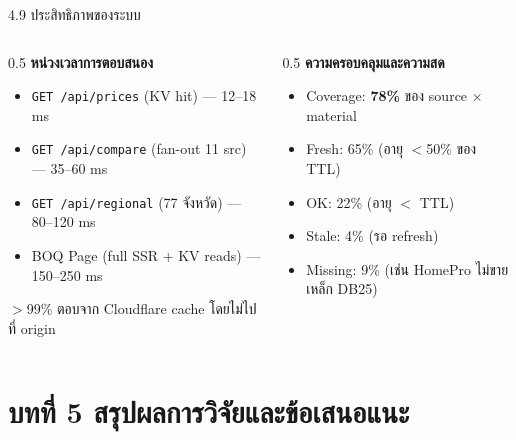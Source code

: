 \documentclass[aspectratio=169,11pt]{beamer}
\begin{document}
\begin{frame}{4.9 ประสิทธิภาพของระบบ}
  \begin{columns}[T,onlytextwidth]
    \begin{column}{0.5\textwidth}
      \footnotesize
      \textbf{หน่วงเวลาการตอบสนอง}
      \begin{itemize}
        \item \texttt{GET /api/prices} (KV hit) --- 12--18 ms
        \item \texttt{GET /api/compare} (fan-out 11 src) --- 35--60 ms
        \item \texttt{GET /api/regional} (77 จังหวัด) --- 80--120 ms
        \item BOQ Page (full SSR + KV reads) --- 150--250 ms
      \end{itemize}
      $>$99\% ตอบจาก Cloudflare cache โดยไม่ไปที่ origin
    \end{column}
    \begin{column}{0.5\textwidth}
      \footnotesize
      \textbf{ความครอบคลุมและความสด}
      \begin{itemize}
        \item Coverage: \textbf{78\%} ของ source $\times$ material
        \item \textcolor{green2}{Fresh}: 65\% (อายุ $<$50\% ของ TTL)
        \item OK: 22\% (อายุ $<$ TTL)
        \item \textcolor{red2}{Stale}: 4\% (รอ refresh)
        \item Missing: 9\% (เช่น HomePro ไม่ขายเหล็ก DB25)
      \end{itemize}
    \end{column}
  \end{columns}
\end{frame}

\section{บทที่ 5 สรุปผลการวิจัยและข้อเสนอแนะ}
\end{document}
